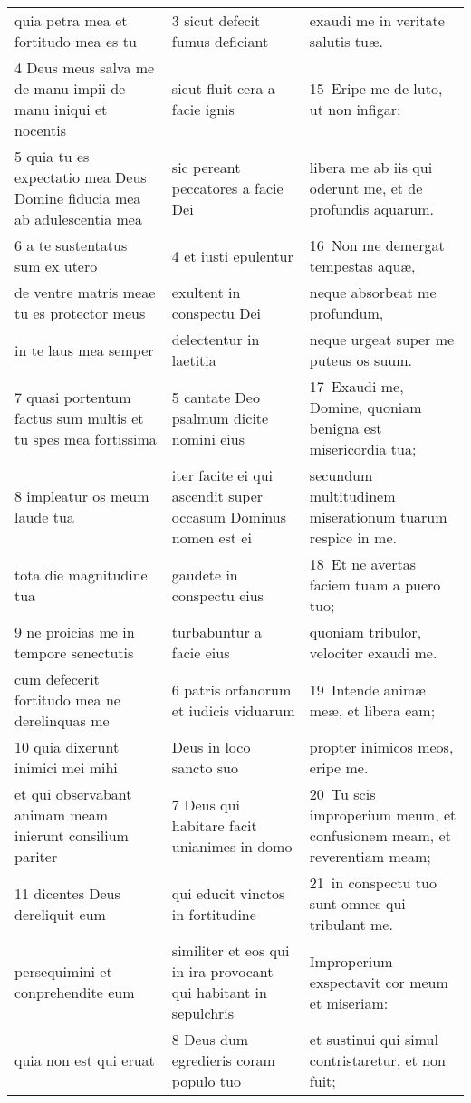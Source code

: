 \documentclass{article}
\begin{document}
\begin{longtable}{@{}p{}p{}p{}@{}}
quia petra mea et fortitudo mea es tu	&	3 sicut defecit fumus deficiant	&	exaudi me in veritate salutis tuæ.	\\
4 Deus meus salva me de manu impii de manu iniqui et nocentis	&	sicut fluit cera a facie ignis	&	15 Eripe me de luto, ut non infigar;	\\
5 quia tu es expectatio mea Deus Domine fiducia mea ab adulescentia mea	&	sic pereant peccatores a facie Dei	&	libera me ab iis qui oderunt me, et de profundis aquarum.	\\
6 a te sustentatus sum ex utero	&	4 et iusti epulentur	&	16 Non me demergat tempestas aquæ,	\\
de ventre matris meae tu es protector meus	&	exultent in conspectu Dei	&	neque absorbeat me profundum,	\\
in te laus mea semper	&	delectentur in laetitia	&	neque urgeat super me puteus os suum.	\\
7 quasi portentum factus sum multis et tu spes mea fortissima	&	5 cantate Deo psalmum dicite nomini eius	&	17 Exaudi me, Domine, quoniam benigna est misericordia tua;	\\
8 impleatur os meum laude tua	&	iter facite ei qui ascendit super occasum Dominus nomen est ei	&	secundum multitudinem miserationum tuarum respice in me.	\\
tota die magnitudine tua	&	gaudete in conspectu eius	&	18 Et ne avertas faciem tuam a puero tuo;	\\
9 ne proicias me in tempore senectutis	&	turbabuntur a facie eius	&	quoniam tribulor, velociter exaudi me.	\\
cum defecerit fortitudo mea ne derelinquas me	&	6 patris orfanorum et iudicis viduarum	&	19 Intende animæ meæ, et libera eam;	\\
10 quia dixerunt inimici mei mihi	&	Deus in loco sancto suo	&	propter inimicos meos, eripe me.	\\
et qui observabant animam meam inierunt consilium pariter	&	7 Deus qui habitare facit unianimes in domo	&	20 Tu scis improperium meum, et confusionem meam, et reverentiam meam;	\\
11 dicentes Deus dereliquit eum	&	qui educit vinctos in fortitudine	&	21 in conspectu tuo sunt omnes qui tribulant me.	\\
persequimini et conprehendite eum	&	similiter et eos qui in ira provocant qui habitant in sepulchris	&	Improperium exspectavit cor meum et miseriam:	\\
quia non est qui eruat	&	8 Deus dum egredieris coram populo tuo	&	et sustinui qui simul contristaretur, et non fuit;	\\

\end{longtable}
\end{document}
